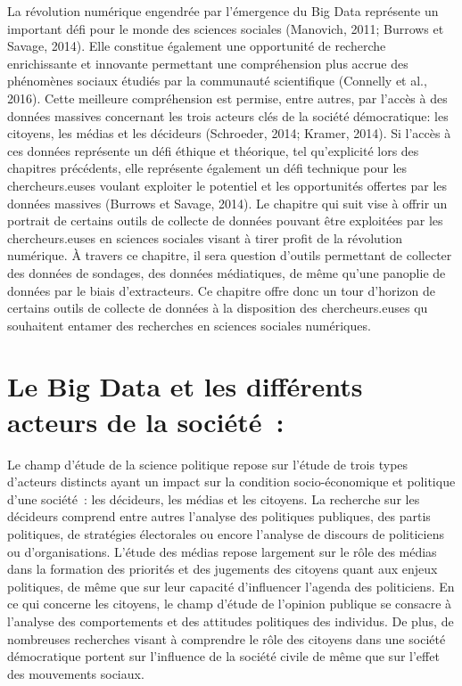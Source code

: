 \documentclass[
  letterpaper,
]{scrbook}
\begin{document}
La révolution numérique engendrée par l'émergence du Big Data représente
un important défi pour le monde des sciences sociales (Manovich, 2011;
Burrows et Savage, 2014). Elle constitue également une opportunité de
recherche enrichissante et innovante permettant une compréhension plus
accrue des phénomènes sociaux étudiés par la communauté scientifique
(Connelly et al., 2016). Cette meilleure compréhension est permise,
entre autres, par l'accès à des données massives concernant les trois
acteurs clés de la société démocratique: les citoyens, les médias et les
décideurs (Schroeder, 2014; Kramer, 2014). Si l'accès à ces données
représente un défi éthique et théorique, tel qu'explicité lors des
chapitres précédents, elle représente également un défi technique pour
les chercheurs.euses voulant exploiter le potentiel et les opportunités
offertes par les données massives (Burrows et Savage, 2014). Le chapitre
qui suit vise à offrir un portrait de certains outils de collecte de
données pouvant être exploitées par les chercheurs.euses en sciences
sociales visant à tirer profit de la révolution numérique. À travers ce
chapitre, il sera question d'outils permettant de collecter des données
de sondages, des données médiatiques, de même qu'une panoplie de données
par le biais d'extracteurs. Ce chapitre offre donc un tour d'horizon de
certains outils de collecte de données à la disposition des
chercheurs.euses qu souhaitent entamer des recherches en sciences
sociales numériques.

\hypertarget{le-big-data-et-les-diffuxe9rents-acteurs-de-la-sociuxe9tuxe9}{%
\section{\texorpdfstring{\textbf{Le Big Data et les différents acteurs
de la
société~:}}{Le Big Data et les différents acteurs de la société~:}}\label{le-big-data-et-les-diffuxe9rents-acteurs-de-la-sociuxe9tuxe9}}

Le champ d'étude de la science politique repose sur l'étude de trois
types d'acteurs distincts ayant un impact sur la condition
socio-économique et politique d'une société~: les décideurs, les médias
et les citoyens. La recherche sur les décideurs comprend entre autres
l'analyse des politiques publiques, des partis politiques, de stratégies
électorales ou encore l'analyse de discours de politiciens ou
d'organisations. L'étude des médias repose largement sur le rôle des
médias dans la formation des priorités et des jugements des citoyens
quant aux enjeux politiques, de même que sur leur capacité d'influencer
l'agenda des politiciens. En ce qui concerne les citoyens, le champ
d'étude de l'opinion publique se consacre à l'analyse des comportements
et des attitudes politiques des individus. De plus, de nombreuses
recherches visant à comprendre le rôle des citoyens dans une société
démocratique portent sur l'influence de la société civile de même que
sur l'effet des mouvements sociaux.
\end{document}
